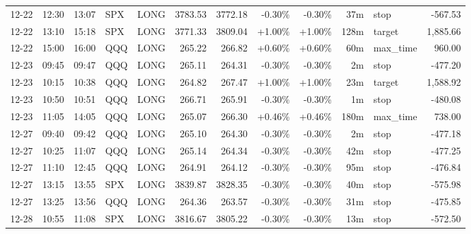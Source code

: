 \documentclass[11pt,a4paper]{article}
\begin{document}
\begin{center}
\begin{longtable}{>{\color{txtmain}}l l l l l r r r r r >{\color{txtmain}}l r}
12-22 & 12:30 & 13:07 & SPX & LONG & 3783.53 & 3772.18 & \textcolor{lossred}{-0.30\%} & \textcolor{lossred}{-0.30\%} & 37m & stop & \textcolor{lossred}{-567.53} \\
12-22 & 13:10 & 15:18 & SPX & LONG & 3771.33 & 3809.04 & \textcolor{wingreen}{+1.00\%} & \textcolor{wingreen}{+1.00\%} & 128m & target & \textcolor{wingreen}{1,885.66} \\
12-22 & 15:00 & 16:00 & QQQ & LONG & 265.22 & 266.82 & \textcolor{wingreen}{+0.60\%} & \textcolor{wingreen}{+0.60\%} & 60m & max\_time & \textcolor{wingreen}{960.00} \\
12-23 & 09:45 & 09:47 & QQQ & LONG & 265.11 & 264.31 & \textcolor{lossred}{-0.30\%} & \textcolor{lossred}{-0.30\%} & 2m & stop & \textcolor{lossred}{-477.20} \\
12-23 & 10:15 & 10:38 & QQQ & LONG & 264.82 & 267.47 & \textcolor{wingreen}{+1.00\%} & \textcolor{wingreen}{+1.00\%} & 23m & target & \textcolor{wingreen}{1,588.92} \\
12-23 & 10:50 & 10:51 & QQQ & LONG & 266.71 & 265.91 & \textcolor{lossred}{-0.30\%} & \textcolor{lossred}{-0.30\%} & 1m & stop & \textcolor{lossred}{-480.08} \\
12-23 & 11:05 & 14:05 & QQQ & LONG & 265.07 & 266.30 & \textcolor{wingreen}{+0.46\%} & \textcolor{wingreen}{+0.46\%} & 180m & max\_time & \textcolor{wingreen}{738.00} \\
12-27 & 09:40 & 09:42 & QQQ & LONG & 265.10 & 264.30 & \textcolor{lossred}{-0.30\%} & \textcolor{lossred}{-0.30\%} & 2m & stop & \textcolor{lossred}{-477.18} \\
12-27 & 10:25 & 11:07 & QQQ & LONG & 265.14 & 264.34 & \textcolor{lossred}{-0.30\%} & \textcolor{lossred}{-0.30\%} & 42m & stop & \textcolor{lossred}{-477.25} \\
12-27 & 11:10 & 12:45 & QQQ & LONG & 264.91 & 264.12 & \textcolor{lossred}{-0.30\%} & \textcolor{lossred}{-0.30\%} & 95m & stop & \textcolor{lossred}{-476.84} \\
12-27 & 13:15 & 13:55 & SPX & LONG & 3839.87 & 3828.35 & \textcolor{lossred}{-0.30\%} & \textcolor{lossred}{-0.30\%} & 40m & stop & \textcolor{lossred}{-575.98} \\
12-27 & 13:25 & 13:56 & QQQ & LONG & 264.36 & 263.57 & \textcolor{lossred}{-0.30\%} & \textcolor{lossred}{-0.30\%} & 31m & stop & \textcolor{lossred}{-475.85} \\
12-28 & 10:55 & 11:08 & SPX & LONG & 3816.67 & 3805.22 & \textcolor{lossred}{-0.30\%} & \textcolor{lossred}{-0.30\%} & 13m & stop & \textcolor{lossred}{-572.50} \\

\end{longtable}
\end{center}
\end{document}
